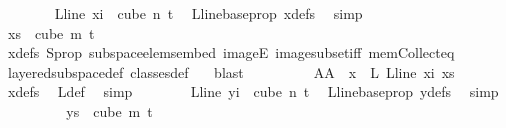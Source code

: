 \begin{isabellebody}
\isanewline
\ \ \ \ \ \ \isamarkupfalse%
\ {\isachardoublequoteopen}{\isacharparenleft}{\kern0pt}L{\isacharunderscore}{\kern0pt}line\ xi{\isacharparenright}{\kern0pt}\ {\isasymin}\ cube\ n\ {\isacharparenleft}{\kern0pt}t{\isacharplus}{\kern0pt}{}{\isacharparenright}{\kern0pt}{\isachardoublequoteclose}\ \isamarkupfalse%
\ L{\isacharunderscore}{\kern0pt}line{\isacharunderscore}{\kern0pt}base{\isacharunderscore}{\kern0pt}prop\ xdefs\ \isamarkupfalse%
\ simp\isanewline
\ \ \ \ \ \ \isamarkupfalse%
\ \isamarkupfalse%
\ {\isachardoublequoteopen}xs\ {\isasymin}\ cube\ m\ {\isacharparenleft}{\kern0pt}t{\isacharplus}{\kern0pt}{}{\isacharparenright}{\kern0pt}{\isachardoublequoteclose}\ \isamarkupfalse%
\ xdefs\ S{\isacharunderscore}{\kern0pt}prop\ subspace{\isacharunderscore}{\kern0pt}elems{\isacharunderscore}{\kern0pt}embed\ imageE\ image{\isacharunderscore}{\kern0pt}subset{\isacharunderscore}{\kern0pt}iff\ mem{\isacharunderscore}{\kern0pt}Collect{\isacharunderscore}{\kern0pt}eq\ \isamarkupfalse%
\ layered{\isacharunderscore}{\kern0pt}subspace{\isacharunderscore}{\kern0pt}def\ classes{\isacharunderscore}{\kern0pt}def\ \ \isamarkupfalse%
\ blast\isanewline
\ \ \ \ \ \ \isamarkupfalse%
\ \isamarkupfalse%
\ AA{}{\isacharcolon}{\kern0pt}\ {\isachardoublequoteopen}{\isasymchi}\ x\ {\isacharequal}{\kern0pt}\ {\isasymchi}L\ {\isacharparenleft}{\kern0pt}L{\isacharunderscore}{\kern0pt}line\ xi{\isacharparenright}{\kern0pt}\ xs{\isachardoublequoteclose}\ \isamarkupfalse%
\ xdefs\ \isamarkupfalse%
\ {\isasymchi}L{\isacharunderscore}{\kern0pt}def\ \isamarkupfalse%
\ simp\isanewline
\isanewline
\ \ \ \ \ \ \isamarkupfalse%
\ {\isachardoublequoteopen}{\isacharparenleft}{\kern0pt}L{\isacharunderscore}{\kern0pt}line\ yi{\isacharparenright}{\kern0pt}\ {\isasymin}\ cube\ n\ {\isacharparenleft}{\kern0pt}t{\isacharplus}{\kern0pt}{}{\isacharparenright}{\kern0pt}{\isachardoublequoteclose}\ \isamarkupfalse%
\ L{\isacharunderscore}{\kern0pt}line{\isacharunderscore}{\kern0pt}base{\isacharunderscore}{\kern0pt}prop\ ydefs\ \isamarkupfalse%
\ simp\isanewline
\ \ \ \ \ \ \isamarkupfalse%
\ \isamarkupfalse%
\ {\isachardoublequoteopen}ys\ {\isasymin}\ cube\ m\ {\isacharparenleft}{\kern0pt}t{\isacharplus}{\kern0pt}{}{\isacharparenright}{\kern0pt}{\isachardoublequoteclose}\ \isamarkupfalse%

\end{isabellebody}
